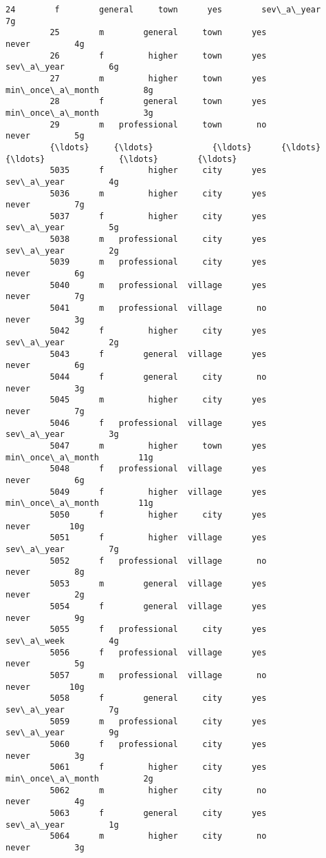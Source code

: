 \documentclass[11pt]{article}
\begin{document}
\begin{Verbatim}[commandchars=\\\{\}]
         24        f        general     town      yes        sev\_a\_year         7g   
         25        m        general     town      yes             never         4g   
         26        f         higher     town      yes        sev\_a\_year         6g   
         27        m         higher     town      yes  min\_once\_a\_month         8g   
         28        f        general     town      yes  min\_once\_a\_month         3g   
         29        m   professional     town       no             never         5g   
         {\ldots}     {\ldots}            {\ldots}      {\ldots}      {\ldots}               {\ldots}        {\ldots}   
         5035      f         higher     city      yes        sev\_a\_year         4g   
         5036      m         higher     city      yes             never         7g   
         5037      f         higher     city      yes        sev\_a\_year         5g   
         5038      m   professional     city      yes        sev\_a\_year         2g   
         5039      m   professional     city      yes             never         6g   
         5040      m   professional  village      yes             never         7g   
         5041      m   professional  village       no             never         3g   
         5042      f         higher     city      yes        sev\_a\_year         2g   
         5043      f        general  village      yes             never         6g   
         5044      f        general     city       no             never         3g   
         5045      m         higher     city      yes             never         7g   
         5046      f   professional  village      yes        sev\_a\_year         3g   
         5047      m         higher     town      yes  min\_once\_a\_month        11g   
         5048      f   professional  village      yes             never         6g   
         5049      f         higher  village      yes  min\_once\_a\_month        11g   
         5050      f         higher     city      yes             never        10g   
         5051      f         higher  village      yes        sev\_a\_year         7g   
         5052      f   professional  village       no             never         8g   
         5053      m        general  village      yes             never         2g   
         5054      f        general  village      yes             never         9g   
         5055      f   professional     city      yes        sev\_a\_week         4g   
         5056      f   professional  village      yes             never         5g   
         5057      m   professional  village       no             never        10g   
         5058      f        general     city      yes        sev\_a\_year         7g   
         5059      m   professional     city      yes        sev\_a\_year         9g   
         5060      f   professional     city      yes             never         3g   
         5061      f         higher     city      yes  min\_once\_a\_month         2g   
         5062      m         higher     city       no             never         4g   
         5063      f        general     city      yes        sev\_a\_year         1g   
         5064      m         higher     city       no             never         3g   
         

\end{Verbatim}
\end{document}
